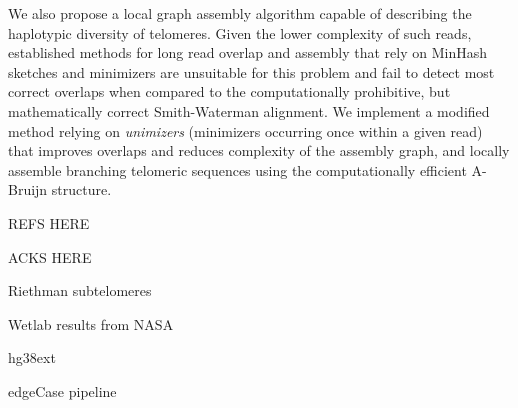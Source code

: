 \documentclass[paperwidth=42in,paperheight=47.75in,portrait]{baposter}
\begin{document}
\begin{poster}
{    We also propose a local graph assembly algorithm capable of describing the haplotypic diversity of telomeres. Given the lower complexity of such
    reads, established methods for long read overlap and assembly that rely on MinHash sketches and minimizers are unsuitable for this problem and fail
    to detect most correct overlaps when compared to the computationally prohibitive, but mathematically correct Smith-Waterman alignment.
    We implement a modified method relying on \textit{unimizers} (minimizers occurring once within a given read) that improves overlaps and reduces
    complexity of the assembly graph, and locally assemble branching telomeric sequences using the computationally efficient A-Bruijn structure.
}


{
    REFS HERE
%
%
}


{
    ACKS HERE
}


{
    \vspace{2in}
}


{
    Riethman subtelomeres
    \vspace{2in}
}


{
    Wetlab results from NASA
    \vspace{2in}
}


{
    hg38ext
    \vspace{2in}
}


{
    edgeCase pipeline
}



\end{poster}
\end{document}
